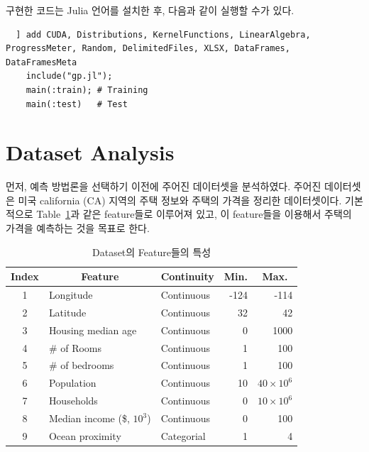 \documentclass[ba, 11pt]{imsart}
\begin{document}
구현한 코드는 Julia 언어를 설치한 후, 다음과 같이 실행할 수가 있다.
\begin{verbatim}
  ] add CUDA, Distributions, KernelFunctions, LinearAlgebra, ProgressMeter, Random, DelimitedFiles, XLSX, DataFrames, DataFramesMeta
    include("gp.jl");
    main(:train); # Training 
    main(:test)   # Test
\end{verbatim}

\section{Dataset Analysis}\label{section:anal}
먼저, 예측 방법론을 선택하기 이전에 주어진 데이터셋을 분석하였다. 
주어진 데이터셋은 미국 california (CA) 지역의 주택 정보와 주택의 가격을 정리한 데이터셋이다.
기본적으로 Table~\ref{table:features}과 같은 feature들로 이루어져 있고, 이 feature들을 이용해서 주택의 가격을 예측하는 것을 목표로 한다.
%
\begin{table}
  \centering
  \begin{threeparttable}
    \caption{Dataset의 Feature들의 특성}\label{table:features}
    \begin{tabular}{cllrr} \toprule
      \textbf{Index}
      & \multicolumn{1}{c}{\textbf{Feature}}
      & \multicolumn{1}{c}{\textbf{Continuity}}
      & \multicolumn{1}{c}{\textbf{Min.}}
      & \multicolumn{1}{c}{\textbf{Max.}}
      \\ \midrule
      1 & Longitude           & Continuous & -124 & -114 \\
      2 & Latitude            & Continuous & 32  & 42 \\
      3 & Housing median age  & Continuous & 0   & 1000 \\
      4 & \# of Rooms         & Continuous & 1   & 100 \\
      5 & \# of bedrooms      & Continuous & 1   & 100 \\
      6 & Population          & Continuous & 10  & \(40 \times 10^6\) \\
      7 & Households          & Continuous & 0   & \(10 \times 10^6\) \\
      8 & Median income (\$, \(10^3\)) & Continuous & 0   & 100 \\
      9 & Ocean proximity     & Categorial & 1 & 4 \\\bottomrule
    \end{tabular}
  \end{threeparttable}
\end{table}
\end{document}
